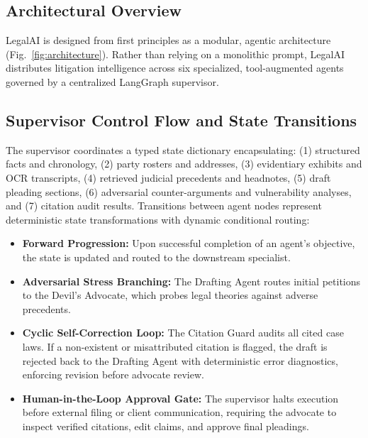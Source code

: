 \documentclass[conference]{IEEEtran}
\begin{document}
\subsection{Architectural Overview}
LegalAI is designed from first principles as a modular, agentic architecture (Fig.~\ref{fig:architecture}). Rather than relying on a monolithic prompt, LegalAI distributes litigation intelligence across six specialized, tool-augmented agents governed by a centralized LangGraph supervisor.

\subsection{Supervisor Control Flow and State Transitions}
The supervisor coordinates a typed state dictionary encapsulating: (1) structured facts and chronology, (2) party rosters and addresses, (3) evidentiary exhibits and OCR transcripts, (4) retrieved judicial precedents and headnotes, (5) draft pleading sections, (6) adversarial counter-arguments and vulnerability analyses, and (7) citation audit results. Transitions between agent nodes represent deterministic state transformations with dynamic conditional routing:
\begin{itemize}
    \item \textbf{Forward Progression:} Upon successful completion of an agent's objective, the state is updated and routed to the downstream specialist.
    \item \textbf{Adversarial Stress Branching:} The Drafting Agent routes initial petitions to the Devil's Advocate, which probes legal theories against adverse precedents.
    \item \textbf{Cyclic Self-Correction Loop:} The Citation Guard audits all cited case laws. If a non-existent or misattributed citation is flagged, the draft is rejected back to the Drafting Agent with deterministic error diagnostics, enforcing revision before advocate review.
    \item \textbf{Human-in-the-Loop Approval Gate:} The supervisor halts execution before external filing or client communication, requiring the advocate to inspect verified citations, edit claims, and approve final pleadings.
\end{itemize}
\end{document}
